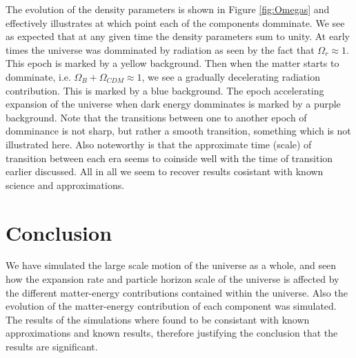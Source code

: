 \documentclass[twocolumn]{aastex62}
\begin{document}
The evolution of the density parameters is shown in Figure \ref{fig:Omegas} and effectively
illustrates at which point each of the components domminate. We see as expected
that at any given time the density parameters sum to unity. At early times the
universe was domminated by radiation as seen by the fact that $\Omega_r \approx
1$. This epoch is marked by a yellow background. Then when the matter starts to
domminate, i.e. $\Omega_B + \Omega_{CDM} \approx 1$, we see a gradually
decelerating radiation contribution. This is marked by a blue background. The
epoch accelerating expansion of the universe when dark energy domminates is
marked by a purple background. Note that the transitions between one to another
epoch of domminance is not sharp, but rather a smooth transition, something
which is not illustrated here. Also noteworthy is that the approximate time
(scale) of transition between each era seems to coinside well with the time of
transition earlier discussed. All in all we seem to recover results cosistant
with known science and approximations. 


\section{Conclusion} \label{sec:Conclusion}
We have simulated the large scale motion of the universe as a whole, and seen
how the expansion rate and particle horizon scale of the universe is affected by
the different matter-energy contributions contained within the universe. Also
the evolution of the matter-energy contribution of each component was simulated.
The results of the simulations where found to be consistant with known
approximations and known results, therefore justifying the conclusion that the
results are significant.




\end{document}

